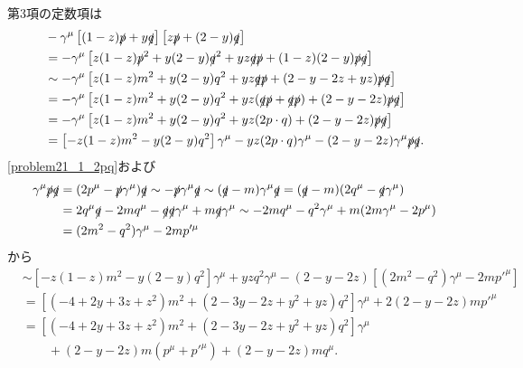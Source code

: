 第3項の定数項は
\begin{align*}
  & - \gamma^\mu \left[ (1-z) \slashed{p} + y \slashed{q} \right] \left[ z \slashed{p} + (2-y) \slashed{q} \right] \\
  &= - \gamma^\mu \left[ z(1-z) \slashed{p}^2+ y(2-y) \slashed{q}^2 + yz \slashed{q}\slashed{p} + (1-z)(2-y) \slashed{p}\slashed{q} \right] \\
  &\sim - \gamma^\mu \left[ z(1-z) m^2 + y(2-y) q^2 + yz \slashed{q}\slashed{p} + (2-y-2z+yz) \slashed{p}\slashed{q} \right] \\
  &= - \gamma^\mu \left[ z(1-z) m^2 + y(2-y) q^2 + yz (\slashed{q}\slashed{p}+\slashed{q}\slashed{p}) + (2-y-2z) \slashed{p}\slashed{q} \right] \\
  &= - \gamma^\mu \left[ z(1-z) m^2 + y(2-y) q^2 + yz (2 p\cdot q) + (2-y-2z) \slashed{p}\slashed{q} \right] \\
  &= \left[ -z(1-z)m^2 - y(2-y) q^2 \right] \gamma^\mu - yz (2p\cdot q) \gamma^\mu - (2-y-2z) \gamma^\mu\slashed{p}\slashed{q} .
\end{align*}
\eqref{problem21_1_2pq}および
\begin{align*}
  \gamma^\mu\slashed{p}\slashed{q} &= (2p^\mu - \slashed{p} \gamma^\mu) \slashed{q}
  \sim - \slashed{p} \gamma^\mu \slashed{q} \sim (\slashed{q}-m) \gamma^\mu \slashed{q}
  = (\slashed{q}-m) (2q^\mu - \slashed{q} \gamma^\mu ) \\
  &= 2q^\mu\slashed{q} - 2mq^\mu - \slashed{q}\slashed{q}\gamma^\mu + m \slashed{q}\gamma^\mu
  \sim -2mq^\mu - q^2\gamma^\mu + m(2m\gamma^\mu - 2p^\mu) \\
  &= (2m^2-q^2) \gamma^\mu - 2mp'^\mu
\end{align*}
から
\begin{align*}
  &\sim \left[ -z(1-z)m^2 - y(2-y) q^2 \right] \gamma^\mu + yzq^2 \gamma^\mu - (2-y-2z) [(2m^2-q^2) \gamma^\mu - 2mp'^\mu] \\
  &= \left[ (-4+2y+3z+z^2)m^2 + (2-3y-2z+y^2+yz)q^2 \right] \gamma^\mu + 2(2-y-2z)m p'^\mu \\
  &= \left[ (-4+2y+3z+z^2)m^2 + (2-3y-2z+y^2+yz)q^2 \right] \gamma^\mu \\
  &\qquad + (2-y-2z)m (p^\mu+p'^\mu) + (2-y-2z)m q^\mu .
\end{align*}

